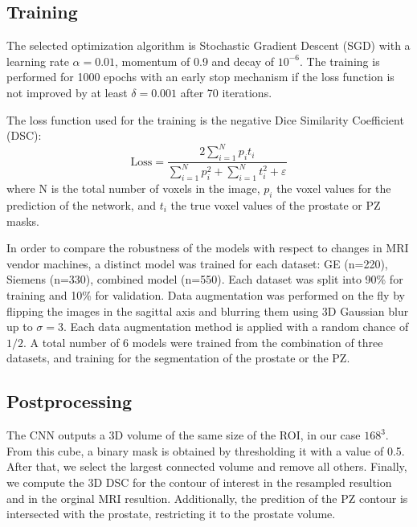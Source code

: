 \subsection{Training}
\label{subsec:training}
The selected optimization algorithm is Stochastic Gradient Descent (SGD) with a learning rate $\alpha = 0.01$, momentum of 0.9 and decay of $10^{-6}$. The training is performed for 1000 epochs with an early stop mechanism if the loss function is not improved by at least $\delta = 0.001$ after 70 iterations. 

The loss function used for the training is the negative Dice Similarity Coefficient (DSC):
\begin{equation}
\text{Loss} = \frac{2 \sum_{i=1}^{N}p_it_i}{\sum_{i=1}^{N}p_i^2 + \sum_{i=1}^{N}t_i^2 + \varepsilon} 
\label{eq:dsc}
\end{equation}
where N is the total number of voxels in the image, $p_i$ the voxel values for the prediction of the network, and $t_i$ the true voxel values of the prostate or PZ masks.

In order to compare the robustness of the models with respect to changes in MRI vendor machines,  a distinct model was trained for each dataset: GE (n=220), Siemens (n=330), combined model (n=550). Each dataset was split into 90\% for training and 10\% for validation. Data augmentation was performed on the fly by flipping the images in the sagittal axis and blurring them using 3D Gaussian blur up to $\sigma = 3$. Each data augmentation method is applied with a random chance of $1/2$.  
A total number of 6 models were trained from the combination of three datasets, and training for the segmentation of the prostate or the PZ. 

\subsection{Postprocessing}
The CNN outputs a 3D volume of the same size of the ROI, in our case $168^3$. From this cube, a binary mask is obtained by thresholding it with a value of 0.5. After that, we select the largest connected volume and remove all others. Finally, we compute the 3D DSC for the contour of interest in the resampled resultion and in the orginal MRI resultion. Additionally, the predition of the PZ contour is intersected with the prostate, restricting it to the prostate volume.

